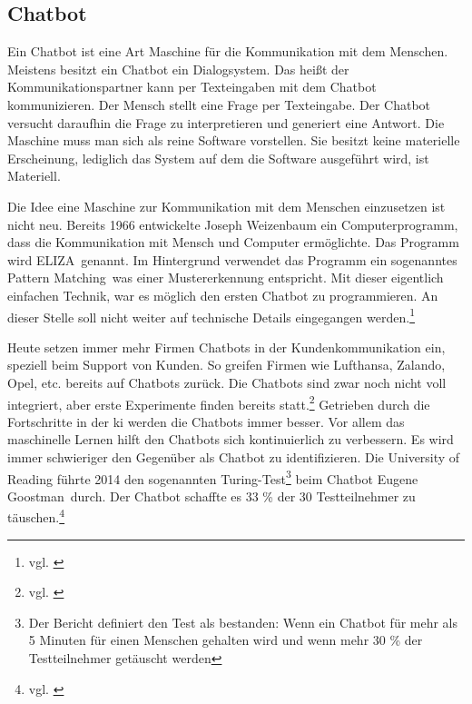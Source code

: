 \subsection{Chatbot}
Ein Chatbot ist eine Art Maschine für die Kommunikation mit dem Menschen. Meistens besitzt ein Chatbot ein Dialogsystem. Das heißt der Kommunikationspartner kann per Texteingaben mit dem Chatbot kommunizieren. Der Mensch stellt eine Frage per Texteingabe. Der Chatbot versucht daraufhin die Frage zu interpretieren und generiert eine Antwort. Die Maschine muss man sich als reine Software vorstellen. Sie besitzt keine materielle Erscheinung, lediglich das System auf dem die Software ausgeführt wird, ist Materiell.

Die Idee eine Maschine zur Kommunikation mit dem Menschen einzusetzen ist nicht neu. Bereits 1966 entwickelte Joseph Weizenbaum ein Computerprogramm, dass die Kommunikation mit Mensch und Computer ermöglichte. Das Programm wird \glqq ELIZA\grqq\ genannt. Im Hintergrund verwendet das Programm ein sogenanntes \glqq Pattern Matching\grqq\, was einer Mustererkennung entspricht. Mit dieser eigentlich einfachen Technik, war es möglich den ersten Chatbot zu programmieren. An dieser Stelle soll nicht weiter auf technische Details eingegangen werden.\footnote{vgl. \cite{WikiELIZA}}    

Heute setzen immer mehr Firmen Chatbots in der Kundenkommunikation ein, speziell beim Support von Kunden. So greifen Firmen wie Lufthansa, Zalando, Opel, etc. bereits auf Chatbots zurück. Die Chatbots sind zwar noch nicht voll integriert, aber erste Experimente finden bereits statt.\footnote{vgl. \cite{UnternehmenChatbots}} Getrieben durch die Fortschritte in der \ac{ki} werden die Chatbots immer besser. Vor allem das maschinelle Lernen hilft den Chatbots sich kontinuierlich zu verbessern. Es wird immer schwieriger den Gegenüber als Chatbot zu identifizieren. Die University of Reading führte 2014 den sogenannten Turing-Test\footnote{Der Bericht definiert den Test als bestanden: Wenn ein Chatbot für mehr als 5 Minuten für einen Menschen gehalten wird und wenn mehr 30 \% der Testteilnehmer getäuscht werden} beim Chatbot \glqq Eugene Goostman\grqq\ durch. Der Chatbot schaffte es 33 \% der 30 Testteilnehmer zu täuschen.\footnote{vgl. \cite{UnivOfReading}}


